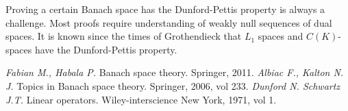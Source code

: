 \documentclass[12pt]{article}
\begin{document}
Proving a certain Banach space has the Dunford-Pettis property is always a
challenge. Most proofs require understanding of weakly null sequences of dual
spaces. It is known since the times of Grothendieck that $L_1$ spaces and
$C(K)$-spaces have the Dunford-Pettis property.

\newpage
\begin{thebibliography}{999}
    \textit{Fabian M., Habala P.} Banach space theory. Springer, 2011.
    \textit{Albiac F., Kalton N. J.} Topics in Banach space theory. Springer,
    2006, vol 233.
    \textit{Dunford N. Schwartz J.T.} Linear operators. Wiley-interscience New
    York, 1971, vol 1.
\end{thebibliography}
\end{document}
